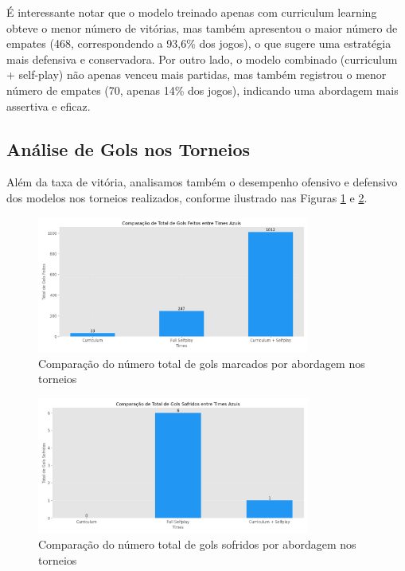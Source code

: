 É interessante notar que o modelo treinado apenas com curriculum learning obteve o menor número de vitórias, mas também apresentou o maior número de empates (468, correspondendo a 93,6\% dos jogos), o que sugere uma estratégia mais defensiva e conservadora. Por outro lado, o modelo combinado (curriculum + self-play) não apenas venceu mais partidas, mas também registrou o menor número de empates (70, apenas 14\% dos jogos), indicando uma abordagem mais assertiva e eficaz.

\subsection{Análise de Gols nos Torneios}

Além da taxa de vitória, analisamos também o desempenho ofensivo e defensivo dos modelos nos torneios realizados, conforme ilustrado nas Figuras \ref{fig:comparacao_gols_feitos} e \ref{fig:comparacao_gols_sofridos}.

\begin{figure}[H]
    \centering
    \includegraphics[width=0.8\textwidth]{fig/graficos_trabalho/graficos_torneios/geral/comparacao_gols_feitos.png}
    \caption{Comparação do número total de gols marcados por abordagem nos torneios}
    \label{fig:comparacao_gols_feitos}
\end{figure}

\begin{figure}[H]
    \centering
    \includegraphics[width=0.8\textwidth]{fig/graficos_trabalho/graficos_torneios/geral/comparacao_gols_sofridos.png}
    \caption{Comparação do número total de gols sofridos por abordagem nos torneios}
    \label{fig:comparacao_gols_sofridos}
\end{figure}

